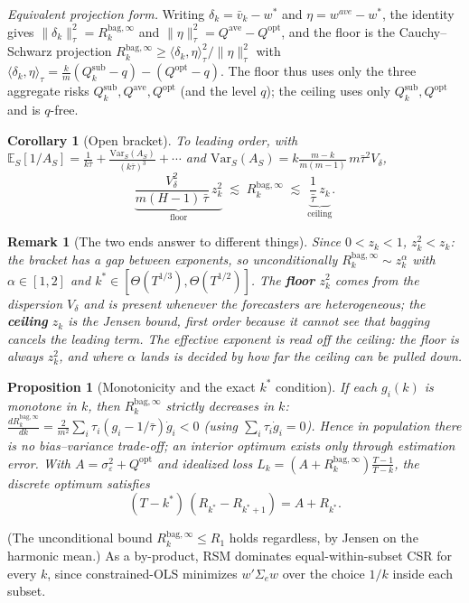 \documentclass[11pt]{article}
\newcommand{\Sig}{\Sigma_e}
\newcommand{\E}{\mathbb{E}}
\newcommand{\Var}{\mathrm{Var}}
\newcommand{\Rk}{R_k^{\mathrm{bag},\infty}}
\newcommand{\Qsub}{Q_k^{\mathrm{sub}}}
\newcommand{\Qopt}{Q^{\mathrm{opt}}}
\newcommand{\Qave}{Q^{\mathrm{ave}}}
\newcommand{\inner}[2]{\langle #1,#2\rangle_\tau}
\newtheorem{proposition}{Proposition}
\newtheorem{corollary}{Corollary}
\newtheorem{remark}{Remark}
\begin{document}
\noindent\emph{Equivalent projection form.} Writing $\delta_k=\bar v_k-w^\ast$ and
$\eta=w^{ave}-w^\ast$, the identity gives $\|\delta_k\|_\tau^2=\Rk$ and
$\|\eta\|_\tau^2=\Qave-\Qopt$, and the floor is the Cauchy--Schwarz projection
$\Rk\ge\inner{\delta_k}{\eta}^2/\|\eta\|_\tau^2$ with
$\inner{\delta_k}{\eta}=\frac km(\Qsub-q)-(\Qopt-q)$. The floor thus uses only the three
aggregate risks $\Qsub,\Qave,\Qopt$ (and the level $q$); the ceiling uses only
$\Qsub,\Qopt$ and is $q$-free.

\begin{corollary}[Open bracket]\label{cor:open}
To leading order, with $\E_S[1/A_S]=\frac1{k\bar\tau}+\frac{\Var_S(A_S)}{(k\bar\tau)^3}
+\cdots$ and $\Var_S(A_S)=k\frac{m-k}{m(m-1)}\,m\bar\tau^2V_\delta$,
\[
  \underbrace{\frac{V_\delta^2}{m(H-1)\,\bar\tau}\,z_k^2}_{\text{floor}}
  \;\lesssim\;\Rk\;\lesssim\;\underbrace{\frac{1}{\bar\tau}\,z_k}_{\text{ceiling}} .
\]
\end{corollary}

\begin{remark}[The two ends answer to different things]\label{rem:asym}
Since $0<z_k<1$, $z_k^2<z_k$: the bracket has a gap between exponents, so unconditionally
$\Rk\sim z_k^\alpha$ with $\alpha\in[1,2]$ and $k^\ast\in[\Theta(T^{1/3}),\Theta(T^{1/2})]$.
The \textbf{floor} $z_k^2$ comes from the dispersion $V_\delta$ and is present whenever the
forecasters are heterogeneous; the \textbf{ceiling} $z_k$ is the Jensen bound, first order
because it cannot see that bagging cancels the leading term. The effective exponent is read
off the ceiling: \emph{the floor is always $z_k^2$, and where $\alpha$ lands is decided by
how far the ceiling can be pulled down.}
\end{remark}

\begin{proposition}[Monotonicity and the exact $k^\ast$ condition]\label{prop:mono}
If each $g_i(k)$ is monotone in $k$, then $\Rk$ strictly decreases in $k$:
$\frac{d\Rk}{dk}=\frac{2}{m^2}\sum_i\tau_i(g_i-1/\bar\tau)\dot g_i<0$ (using
$\sum_i\tau_i\dot g_i=0$). Hence in population there is no bias--variance trade-off; an
interior optimum exists only through estimation error. With $A=\sigma_\varepsilon^2+\Qopt$
and idealized loss $L_k=(A+\Rk)\frac{T-1}{T-k}$, the discrete optimum satisfies
\[
  (T-k^\ast)\,(R_{k^\ast}-R_{k^\ast+1})=A+R_{k^\ast}.
\]
\end{proposition}
\noindent (The unconditional bound $\Rk\le R_1$ holds regardless, by Jensen on the harmonic
mean.) As a by-product, RSM dominates equal-within-subset CSR for every $k$, since
constrained-OLS minimizes $w'\Sig w$ over the choice $1/k$ inside each subset.
\end{document}

